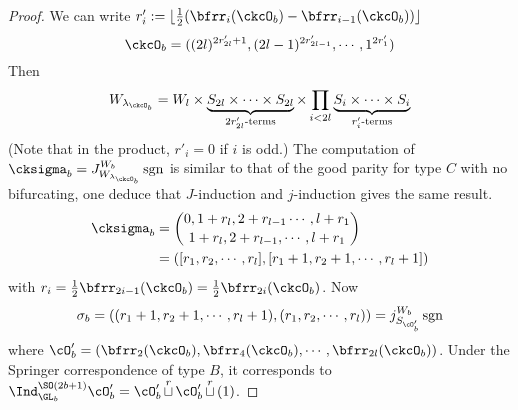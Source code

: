 \documentclass[12pt,a4paper]{amsart}
\newcommand{\sgn}{\operatorname{sgn}}
\numberwithin{equation}{section}
\theoremstyle{remark}
\def\half{{\tfrac{1}{2}}}
\def\floor#1{{\lfloor #1 \rfloor}}
\def\lamckb{\lambda_{\ckcO_b}}
\def\cuprow{{\stackrel{r}{\sqcup}}}
\def\cuprow{{\,\stackrel{r}{\sqcup}\,}}
\begin{document}
\begin{proof}
{      We can write
      $r'_{i} := \floor{\half(\bfrr_{i}(\ckcO_{b})-\bfrr_{i-1}(\ckcO_{b}))}$
      \[
        \ckcO_{b} %
        = ((2l)^{2r'_{2l}+1}, (2l-1)^{2r'_{2l-1}},\cdots, 1^{2r'_{1}})
      \]
      Then
      \[
        W_{\lamckb} = W_{l} \times \underbrace{S_{2l}\times \cdots \times S_{2l}}_{2r'_{2l}\text{-terms}} \times \prod_{i<2l} \underbrace{S_{i}\times \cdots\times S_{i}}_{r'_{i}\text{-terms}}
      \]
      (Note that in the product, $r'_{i}=0$ if $i$ is odd.) The computation of
      $\cksigma_{b} = J_{W_{\lamckb}}^{W_{b}} \sgn$ is similar to that of the
      good parity for type $C$ with no bifurcating, one deduce that
      $J$-induction and $j$-induction gives the same result.
      \[
        \begin{split}
          \cksigma_{b} &=
          \binom{0, 1+r_{l}, 2+r_{l-1}\cdots, l+r_{1}}{1+r_{l},2+r_{l-1}, \cdots, l+r_{1}}\\
          & = ([r_{1},r_{2},\cdots, r_{l}],[r_{1}+1,r_{2}+1,\cdots,r_{l}+1])\\
        \end{split}
      \]
      with $r_{i} = \half\bfrr_{2i-1}(\ckcO_{b}) = \half\bfrr_{2i}(\ckcO_{b})$.
      Now
      \[
        \sigma_{b} = ((r_{1}+1,r_{2}+1,\cdots,r_{l}+1), (r_{1},r_{2},\cdots, r_{l})) = j_{S_{\cO'_{b}}}^{W_{b}}\sgn
      \]
      where
      $\cO'_{b}=(\bfrr_{2}(\ckcO_{b}),\bfrr_{4}(\ckcO_{b}),\cdots, \bfrr_{2l}(\ckcO_{b}))$.
      Under the Springer correspondence of type $B$, it corresponds to
      $\Ind_{\GL_{b}}^{\SO(2b+1)}\cO'_{b} = \cO'_{b}\cuprow \cO'_{b}\cuprow (1)$.



}
\end{proof}
\end{document}
